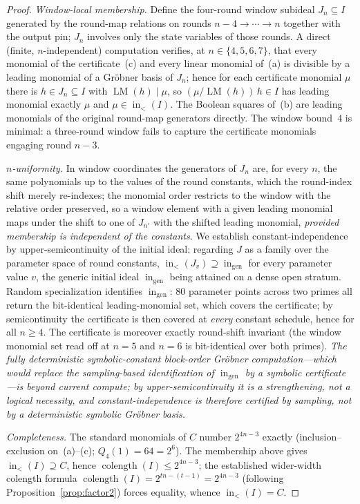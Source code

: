 \documentclass[11pt,a4paper]{article}
\theoremstyle{definition}
\begin{document}
\begin{proof}
\emph{Window-local membership.} Define the four-round window subideal
$J_n \subseteq I$ generated by the round-map relations on rounds
$n-4 \to \cdots \to n$ together with the output pin; $J_n$ involves
only the state variables of those rounds. A direct (finite,
$n$-independent) computation verifies, at $n \in \{4,5,6,7\}$, that
every monomial of the certificate~(c) and every linear monomial
of~(a) is divisible by a leading monomial of a Gr\"obner basis of
$J_n$; hence for each certificate monomial $\mu$ there is $h \in J_n
\subseteq I$ with $\operatorname{LM}(h) \mid \mu$, so
$(\mu / \operatorname{LM}(h))\,h \in I$ has leading monomial exactly
$\mu$ and $\mu \in \operatorname{in}_<(I)$. The Boolean squares of~(b)
are leading monomials of the original round-map generators directly.
The window bound~$4$ is minimal: a three-round window fails to capture
the certificate monomials engaging round $n-3$.

\emph{$n$-uniformity.} In window coordinates the generators of $J_n$
are, for every $n$, the same polynomials up to the values of the
round constants, which the round-index shift merely re-indexes; the
monomial order restricts to the window with the relative order
preserved, so a window element with a given leading monomial maps under
the shift to one of $J_{n'}$ with the shifted leading monomial,
\emph{provided membership is independent of the constants}. We
establish constant-independence by upper-semicontinuity of the initial
ideal: regarding $J$ as a family over the parameter space of round
constants, $\operatorname{in}_<(J_v) \supseteq \operatorname{in}_{\mathrm{gen}}$
for every parameter value $v$, the generic initial ideal
$\operatorname{in}_{\mathrm{gen}}$ being attained on a dense open
stratum. Random specialization identifies
$\operatorname{in}_{\mathrm{gen}}$: $80$ parameter points across two
primes all return the bit-identical leading-monomial set, which covers
the certificate; by semicontinuity the certificate is then covered at
\emph{every} constant schedule, hence for all $n \ge 4$. The
certificate is moreover exactly round-shift invariant (the window
monomial set read off at $n = 5$ and $n = 6$ is bit-identical over
both primes). \emph{The fully deterministic symbolic-constant
block-order Gr\"obner computation---which would replace the
sampling-based identification of $\operatorname{in}_{\mathrm{gen}}$ by
a symbolic certificate---is beyond current compute; by
upper-semicontinuity it is a strengthening, not a logical necessity,
and constant-independence is therefore certified by sampling, not by a
deterministic symbolic Gr\"obner basis.}

\emph{Completeness.} The standard monomials of $C$ number $2^{4n - 3}$
exactly (inclusion--exclusion on~(a)--(c); $Q_4(1) = 64 = 2^6$). The
membership above gives $\operatorname{in}_<(I) \supseteq C$, hence
$\operatorname{colength}(I) \le 2^{4n - 3}$; the established wider-width
colength formula $\operatorname{colength}(I) = 2^{tn - (t-1)} = 2^{4n - 3}$
(following Proposition~\ref{prop:factor2}) forces equality, whence
$\operatorname{in}_<(I) = C$.
\end{proof}
\end{document}
